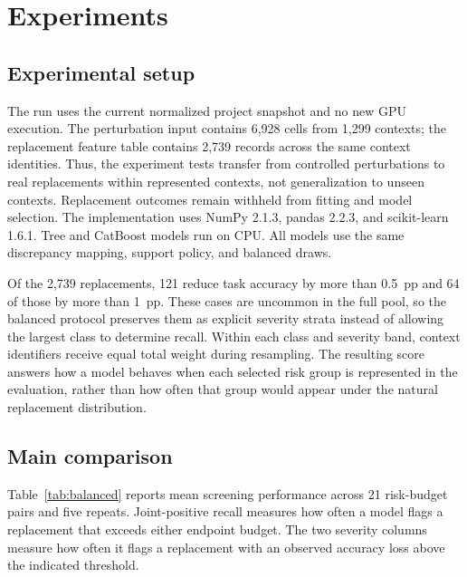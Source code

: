 \documentclass{article}
\begin{document}
\section{Experiments}
\label{sec:experiments}

\subsection{Experimental setup}

The run uses the current normalized project snapshot and no new GPU execution. The perturbation input contains 6,928 cells from 1,299 contexts; the replacement feature table contains 2,739 records across the same context identities. Thus, the experiment tests transfer from controlled perturbations to real replacements within represented contexts, not generalization to unseen contexts. Replacement outcomes remain withheld from fitting and model selection. The implementation uses NumPy 2.1.3, pandas 2.2.3, and scikit-learn 1.6.1. Tree and CatBoost models run on CPU. All models use the same discrepancy mapping, support policy, and balanced draws.

Of the 2,739 replacements, 121 reduce task accuracy by more than 0.5~pp and 64 of those by more than 1~pp. These cases are uncommon in the full pool, so the balanced protocol preserves them as explicit severity strata instead of allowing the largest class to determine recall. Within each class and severity band, context identifiers receive equal total weight during resampling. The resulting score answers how a model behaves when each selected risk group is represented in the evaluation, rather than how often that group would appear under the natural replacement distribution.

\subsection{Main comparison}

Table~\ref{tab:balanced} reports mean screening performance across 21 risk-budget pairs and five repeats. Joint-positive recall measures how often a model flags a replacement that exceeds either endpoint budget. The two severity columns measure how often it flags a replacement with an observed accuracy loss above the indicated threshold.
\end{document}
